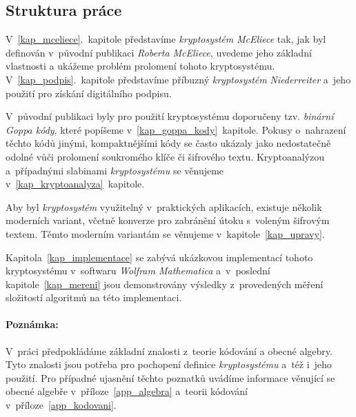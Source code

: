 \documentclass[thesis=M,czech,hidelinks]{FITthesis}[2012/06/26]
\newcommand{\0}{{\textcolor[gray]{0.75}{0}}}
\begin{document}
\begin{introduction}
\section*{Struktura práce}

V~\ref{kap_mceliece}.~kapitole představíme \emph{kryptosystém} \emph{McEliece}
tak, jak byl definován v~původní publikaci \emph{Roberta McEliece}, uvedeme jeho
základní vlastnosti a ukážeme problém prolomení tohoto kryptosystému.
V~\ref{kap_podpis}.~kapitole představíme příbuzný \emph{kryptosystém}
\emph{Niederreiter} a~jeho použití pro získání digitálního podpisu.

V~původní publikaci byly pro použití kryptosystému doporučeny tzv.
\emph{binární Goppa kódy}, které popíšeme v~\ref{kap_goppa_kody}~kapitole.
Pokusy o~nahrazení těchto kódů jinými, kompaktnějšími kódy se často ukázaly jako
nedostatečně odolné vůči prolomení soukromého klíče či šifrového textu.
Kryptoanalýzou a~případnými slabinami \emph{kryptosystému} se věnujeme
v~\ref{kap_kryptoanalyza}~kapitole.

Aby byl \emph{kryptosystém} využitelný v~praktických aplikacích, existuje
několik moderních variant, včetně konverze pro zabránění útoku s~voleným
šifrovým textem. Těmto moderním variantám se věnujeme
v~kapitole~\ref{kap_upravy}.

Kapitola~\ref{kap_implementace} se zabývá ukázkovou implementací tohoto
kryptosystému v~softwaru \emph{Wolfram Mathematica} a~v~poslední
kapitole~\ref{kap_mereni} jsou demonstrovány výsledky z~provedených měření
složitostí algoritmů na této implementaci.

\vfil

\paragraph{Poznámka:} V~práci předpokládáme základní znalosti z~teorie kódování
a obecné algebry. Tyto znalosti jsou potřeba pro pochopení definice
\emph{kryptosystému} a~též i~jeho použití. Pro případné ujasnění těchto poznatků
uvádíme informace věnující se obecné algebře v~příloze~\ref{app_algebra}
a~teorii kódování v~příloze~\ref{app_kodovani}.

\vfill

\end{introduction}





\end{document}
